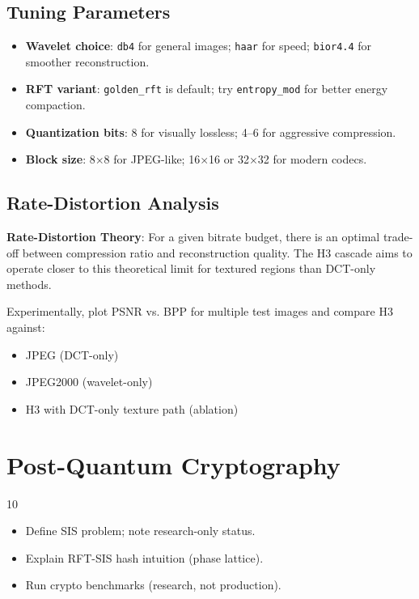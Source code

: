 \documentclass[11pt, a4paper, openany]{book}
\theoremstyle{definition}
\begin{document}
\section{Tuning Parameters}
\begin{itemize}
    \item \textbf{Wavelet choice}: \texttt{db4} for general images; \texttt{haar} for speed; \texttt{bior4.4} for smoother reconstruction.
    \item \textbf{RFT variant}: \texttt{golden\_rft} is default; try \texttt{entropy\_mod} for better energy compaction.
    \item \textbf{Quantization bits}: 8 for visually lossless; 4--6 for aggressive compression.
    \item \textbf{Block size}: 8$\times$8 for JPEG-like; 16$\times$16 or 32$\times$32 for modern codecs.
\end{itemize}

\section{Rate-Distortion Analysis}
\begin{keyconceptbox}
\textbf{Rate-Distortion Theory}: For a given bitrate budget, there is an optimal trade-off between compression ratio and reconstruction quality. The H3 cascade aims to operate closer to this theoretical limit for textured regions than DCT-only methods.
\end{keyconceptbox}

Experimentally, plot PSNR vs. BPP for multiple test images and compare H3 against:
\begin{itemize}
    \item JPEG (DCT-only)
    \item JPEG2000 (wavelet-only)
    \item H3 with DCT-only texture path (ablation)
\end{itemize}

\chapter{Post-Quantum Cryptography}

\begin{todobox}{10}
\begin{itemize}
    \item[$\square$] Define SIS problem; note research-only status.
    \item[$\square$] Explain RFT-SIS hash intuition (phase lattice).
    \item[$\square$] Run crypto benchmarks (research, not production).
\end{itemize}
\end{todobox}
\end{document}
